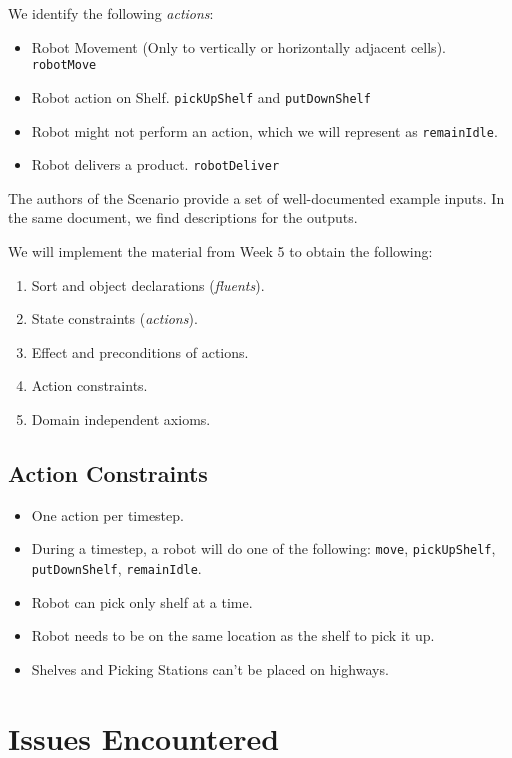 \documentclass[letterpaper]{article} %
\begin{document}
We identify the following \textit{actions}:

\begin{itemize}
    \item Robot Movement (Only to vertically or horizontally adjacent cells). \texttt{robotMove}
    \item Robot action on Shelf. \texttt{pickUpShelf} and \texttt{putDownShelf}
    \item Robot might not perform an action, which we will represent as \texttt{remainIdle}.
    \item Robot delivers a product. \texttt{robotDeliver}
\end{itemize}

The authors of the Scenario\cite{cse579:AutomatedWarehouseScenario} provide a set of well-documented example inputs. In the same document, we find descriptions for the outputs. 

We will implement the material from Week 5 to obtain the following:

\begin{enumerate}
    \item Sort and object declarations (\textit{fluents}).
    \item State constraints (\textit{actions}).
    \item Effect and preconditions of actions.
    \item Action constraints.
    \item Domain independent axioms.
\end{enumerate}

\subsection{Action Constraints}

\begin{itemize}
    \item One action per timestep.
    \item During a timestep, a robot will do one of the following: \texttt{move}, \texttt{pickUpShelf}, \texttt{putDownShelf}, \texttt{remainIdle}.
    \item Robot can pick only shelf at a time.
    \item Robot needs to be on the same location as the shelf to pick it up.
    \item Shelves and Picking Stations can't be placed on highways.
\end{itemize}

\section{Issues Encountered}
\end{document}
